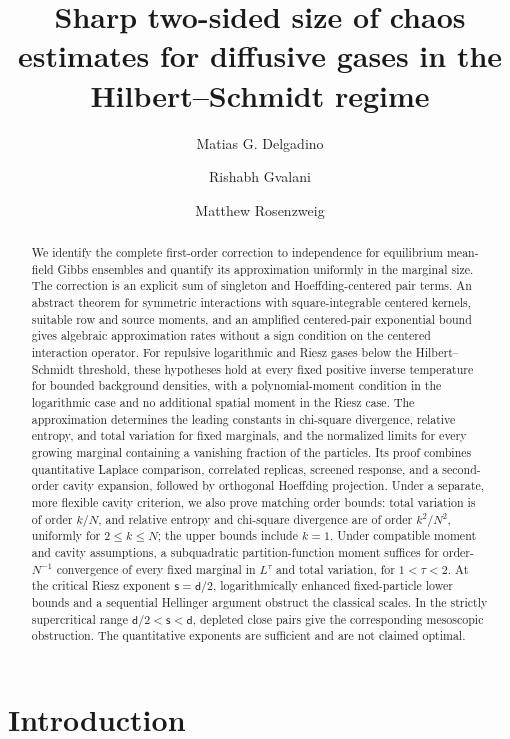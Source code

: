 \documentclass[11pt,reqno]{amsart}
\title[Sharp two-sided size of chaos estimates]{Sharp two-sided size of chaos estimates for diffusive gases in the Hilbert--Schmidt regime}
\author[M.G. Delgadino]{Matias G. Delgadino}
\author[R. Gvalani]{Rishabh Gvalani}
\author[M. Rosenzweig]{Matthew Rosenzweig}
\numberwithin{equation}{section}
\theoremstyle{plain}
\theoremstyle{remark}
\renewcommand{\d}{\mathsf{d}}
\newcommand{\s}{\mathsf{s}}
\begin{document}
\raggedbottom

\begin{abstract}
We identify the complete first-order correction to independence for equilibrium mean-field Gibbs ensembles and quantify its approximation uniformly in the marginal size.  The correction is an explicit sum of singleton and Hoeffding-centered pair terms.  An abstract theorem for symmetric interactions with square-integrable centered kernels, suitable row and source moments, and an amplified centered-pair exponential bound gives algebraic approximation rates without a sign condition on the centered interaction operator.  For repulsive logarithmic and Riesz gases below the Hilbert--Schmidt threshold, these hypotheses hold at every fixed positive inverse temperature for bounded background densities, with a polynomial-moment condition in the logarithmic case and no additional spatial moment in the Riesz case.  The approximation determines the leading constants in chi-square divergence, relative entropy, and total variation for fixed marginals, and the normalized limits for every growing marginal containing a vanishing fraction of the particles.  Its proof combines quantitative Laplace comparison, correlated replicas, screened response, and a second-order cavity expansion, followed by orthogonal Hoeffding projection.  Under a separate, more flexible cavity criterion, we also prove matching order bounds: total variation is of order $k/N$, and relative entropy and chi-square divergence are of order $k^2/N^2$, uniformly for $2\leq k\leq N$; the upper bounds include $k=1$.  Under compatible moment and cavity assumptions, a subquadratic partition-function moment suffices for order-$N^{-1}$ convergence of every fixed marginal in $L^\tau$ and total variation, for $1<\tau<2$.  At the critical Riesz exponent $\s=\d/2$, logarithmically enhanced fixed-particle lower bounds and a sequential Hellinger argument obstruct the classical scales.  In the strictly supercritical range $\d/2<\s<\d$, depleted close pairs give the corresponding mesoscopic obstruction.  The quantitative exponents are sufficient and are not claimed optimal.
\end{abstract}

\maketitle




\section{Introduction}
\label{sec:introduction-main-results}
\end{document}
